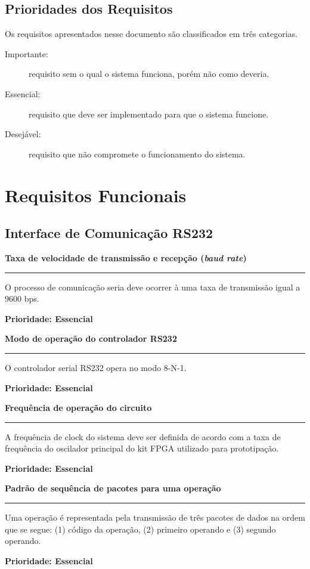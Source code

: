\documentclass{article}
\begin{document}
  \subsection{Prioridades dos Requisitos}
    Os requisitos apresentados nesse documento são classificados em três categorias.

    \begin{description}
      \item[Importante:] requisito sem o qual o sistema funciona, porém não como deveria.
      \item[Essencial:] requisito que deve ser implementado para que o sistema funcione.
      \item[Desejável:] requisito que não compromete o funcionamento do sistema.
    \end{description}

\section{Requisitos Funcionais}

  \subsection{Interface de Comunicação RS232}
  
    \begin{functional}
      \item \textbf{Taxa de velocidade de transmissão e recepção (\textit{baud rate})} \hrule
      O processo de comunicação seria deve ocorrer à uma taxa de transmissão igual a $9600$ bps.

      \textbf{Prioridade: Essencial}

      \item \textbf{Modo de operação do controlador RS232} \hrule
      O controlador serial RS232 opera no modo 8-N-1.

      \textbf{Prioridade: Essencial}      

      \item \textbf{Frequência de operação do circuito} \hrule
      A frequência de clock do sistema deve ser definida de acordo com a taxa de frequência do oscilador principal do kit FPGA utilizado para prototipação.
     
      \textbf{Prioridade: Essencial}   

      \item \textbf{Padrão de sequência de pacotes para uma operação} \hrule
      Uma operação é representada pela transmissão de três pacotes de dados na ordem que se segue: (1) código da operação, (2) primeiro operando e (3) segundo operando.

      \textbf{Prioridade: Essencial}       

    \end{functional}
\end{document}
